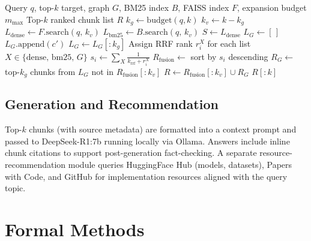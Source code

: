 \documentclass[conference,10pt,twocolumn]{IEEEtran}
\begin{document}
\begin{algorithm}[!ht]
\caption{Adaptive Hybrid Retrieval (AHR)}
\label{alg:ahr}
\begin{algorithmic}[1]
\Require Query $q$, top-$k$ target, graph $G$, BM25 index $B$, FAISS index $F$, expansion budget $m_{\max}$
\Ensure Top-$k$ ranked chunk list $R$
\State $k_g \gets \mathrm{budget}(q, k)$ 
\State $k_v \gets k - k_g$ 
\State $L_{\mathrm{dense}} \gets F.\mathrm{search}(q,\,k_v)$
\State $L_{\mathrm{bm25}} \gets B.\mathrm{search}(q,\,k_v)$
\State $S \gets L_{\mathrm{dense}}$ 
\State $L_G \gets [\,]$
      \State $L_G.\mathrm{append}(c')$
    \EndIf
  \EndFor
\EndFor
\State $L_G \gets L_G[:k_g]$ 
\State Assign RRF rank $r^X_i$ for each list $X \in \{\mathrm{dense},\,\mathrm{bm25},\,G\}$
  \State $s_i \gets \sum_X \frac{1}{k_{\mathrm{rrf}}+r^X_i}$ 
\EndFor
\State $R_{\mathrm{fusion}} \gets$ sort by $s_i$ descending
\State $R_G \gets$ top-$k_g$ chunks from $L_G$ not in $R_{\mathrm{fusion}}[:k_v]$
\State $R \gets R_{\mathrm{fusion}}[:k_v] \cup R_G$ 
\Return $R[:k]$
\end{algorithmic}
\end{algorithm}

\subsection{Generation and Recommendation}

Top-$k$ chunks (with source metadata) are formatted into a context prompt and passed to DeepSeek-R1:7b running locally via Ollama. Answers include inline chunk citations to support post-generation fact-checking. A separate resource-recommendation module queries HuggingFace Hub (models, datasets), Papers with Code, and GitHub for implementation resources aligned with the query topic.

\section{Formal Methods}
\label{sec:methods}
\end{document}
